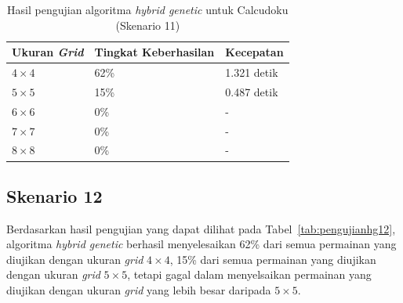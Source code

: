 \begin{table}
\centering
\captionsetup{justification=centering}
\caption[Hasil pengujian algoritma \textit{hybrid genetic} untuk Calcudoku (Skenario 11)]{Hasil pengujian algoritma \textit{hybrid genetic} untuk Calcudoku (Skenario 11)}
\begin{tabular}{| l | l | l |}
\hline
Ukuran \textit{Grid} & Tingkat Keberhasilan & Kecepatan \\
\hline \hline
\begin{math}4 \times 4\end{math} & 62\% & 1.321 detik \\
\hline
\begin{math}5 \times 5\end{math} & 15\% & 0.487 detik \\
\hline
\begin{math}6 \times 6\end{math} & 0\% & - \\
\hline
\begin{math}7 \times 7\end{math} & 0\% & - \\
\hline
\begin{math}8 \times 8\end{math} & 0\% & - \\
\hline
\end{tabular}
\label{tab:pengujianhg11}
\end{table}

\subsection{Skenario 12}
\label{sec:skenario12}

Berdasarkan hasil pengujian yang dapat dilihat pada Tabel~\ref{tab:pengujianhg12}, algoritma \textit{hybrid genetic} berhasil menyelesaikan 62\% dari semua permainan yang diujikan dengan ukuran \textit{grid} \begin{math}4 \times 4\end{math}, 15\% dari semua permainan yang diujikan dengan ukuran \textit{grid} \begin{math}5 \times 5\end{math}, tetapi gagal dalam menyelsaikan permainan yang diujikan dengan ukuran \textit{grid} yang lebih besar daripada \begin{math}5 \times 5\end{math}.

